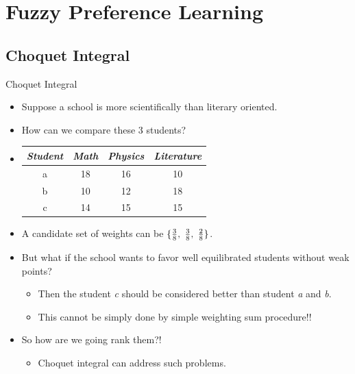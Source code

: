 \documentclass[]{beamer}
\newcommand{\Xtri}{$\blacktriangleright$ }
\newcommand{\itemXtri}{\item[\Xtri]}
\renewcommand{\|}[1][.3em]{\hspace{#1}|\hspace{#1}}
\renewcommand{\,}[1][.3em]{,\hspace{#1}}
\begin{document}
\section{Fuzzy Preference Learning}
\frame{\tableofcontents[currentsection]}
\subsection{Choquet Integral}
\begin{frame}{Choquet Integral}
    \begin{itemize}
    \item<1-> Suppose a school is more scientifically than literary oriented.
    \item<2-> How can we compare these 3 students?
    \item<2->[] \vspace{1em}
        \begin{table}
            \centering
            \begin{tabular}{c|ccc}
                \textit{Student} & \textit{Math} & \textit{Physics} & \textit{Literature} \\\hline
                a & 18 & 16 & 10\\
                b & 10 & 12 & 18\\
                c & 14 & 15 & 15\\
            \end{tabular}
        \end{table}\vspace{1em}
    \item<3-> A candidate set of weights can be $\{\frac{3}{8}\,\frac{3}{8}\,\frac{2}{8}\}$.
    \item<4-> But what if the school wants to favor well equilibrated students without weak points?
        \begin{itemize}
        \itemXtri Then the \textcolor{light-blue}{student \textit{c}} should be considered \textcolor{light-blue}{better than student \textit{a} and \textit{b}}.
        \itemXtri This cannot be simply done by simple \textcolor{light-red}{weighting sum} procedure!!
        \end{itemize}
    \item<5-> So how are we going rank them?!
        \begin{itemize}
        \itemXtri \textcolor{light-blue}{Choquet integral} can address such problems.
        \end{itemize}
    \end{itemize}
\end{frame}
\end{document}
